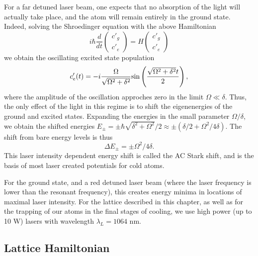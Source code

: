 	For a far detuned laser beam, one expects that no absorption of the light will actually take place, and the atom will remain entirely in the ground state. Indeed, solving the Shroedinger equation with the above Hamiltonian
\begin{equation}
i\hbar \frac{d}{dt} \begin{pmatrix} c'_g \\ c'_e \end{pmatrix} = H \begin{pmatrix} c'_g \\ c'_e \end{pmatrix}
\end{equation}
we obtain the oscillating excited state population 
\begin{equation}
c'_e(t) = -i \frac{\Omega}{\sqrt{\Omega^2 + \delta^2}}{\rm sin}\left(\frac{\sqrt{\Omega^2 + \delta^2}t}{2}\right),
\end{equation}
where the amplitude of the oscillation approches zero in the limit $\Omega \ll \delta$. Thus, the only effect of the light in this regime is to shift the eigenenergies of the ground and excited states. Expanding the energies in the small parameter $\Omega/\delta$, we obtain the shifted energies $E_{\pm} = \pm \hbar \sqrt{\delta^2 + \Omega^2}/2 \approx \pm (\delta/2 + \Omega^2/4\delta)$. The shift from bare energy levels is thus 
\begin{equation}
\Delta E_{\pm} = \pm \Omega^2/4\delta.
\end{equation}
This laser intensity dependent energy shift is called the AC Stark shift, and is the basis of most laser created potentials for cold atoms. 
	
	For the ground state, and a red detuned laser beam (where the laser frequency is lower than the resonant frequency), this creates energy minima in locations of maximal laser intensity. For the lattice described in this chapter, as well as for the trapping of our atoms in the final stages of cooling, we use high power (up to 10 W) lasers with wavelength $\lambda_L = 1064 $ nm. 

\subsection{Lattice Hamiltonian}

